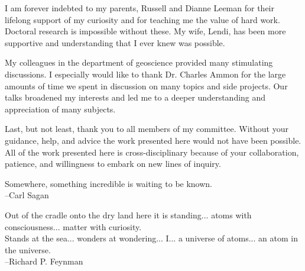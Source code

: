 \documentclass[11pt]{psuthesis}
\begin{document}
\begin{frontmatter}
\acknowledgments  

I am forever indebted to my parents, Russell and Dianne Leeman for their lifelong support of my curiosity and for teaching me the value of hard work. Doctoral research is impossible without these. My wife, Lendi, has been more supportive and understanding that I ever knew was possible. 

My colleagues in the department of geoscience provided many stimulating discussions. I especially would like to thank Dr. Charles Ammon for the large amounts of time we spent in discussion on many topics and side projects. Our talks broadened my interests and led me to a deeper understanding and appreciation of many subjects.

Last, but not least, thank you to all members of my committee. Without your guidance, help, and advice the work presented here would not have been possible. All of the work presented here is cross-disciplinary because of your collaboration, patience, and willingness to embark on new lines of inquiry.


\clearpage

\vspace*{2.0truein}

\parbox{4.0truein}{
\par\noindent
Somewhere, something incredible is waiting to be known.\\
\hspace*{\fill}--Carl Sagan
}

\vspace{4pc}

\parbox{4.0truein}{
\par\noindent
Out of the cradle onto the dry land here it is standing... atoms with consciousness... matter with curiosity.\\
Stands at the sea... wonders at wondering... I... a universe of atoms... an atom in the universe.\\
\hspace*{\fill}--Richard P. Feynman
}
\end{frontmatter}








\end{document}
